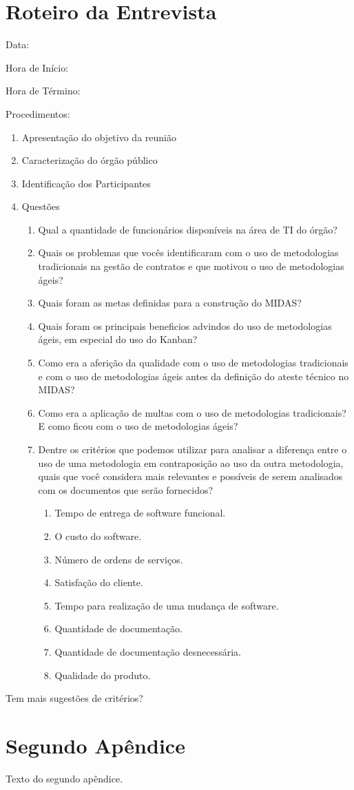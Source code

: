 \begin{apendicesenv}

\partapendices

\chapter{Roteiro da Entrevista}

Data: 

Hora de Início:

Hora de Término:

Procedimentos:

\begin{enumerate}
\item Apresentação do objetivo da reunião
\item Caracterização do órgão público
\item Identificação dos Participantes
\item Questões
\begin{enumerate} 
\item Qual a quantidade de funcionários disponíveis na área de TI do órgão?
\item Quais os problemas que vocês identificaram com o uso de metodologias tradicionais na gestão de contratos e que motivou o uso de metodologias ágeis?
\item Quais foram as metas definidas para a construção do MIDAS?
\item Quais foram os principais beneficios advindos do uso de metodologias ágeis, em especial do uso do Kanban?
\item Como era a aferição da qualidade com o uso de metodologias tradicionais e com o uso de metodologias ágeis antes da definição do ateste técnico no MIDAS?
\item Como era a aplicação de multas com o uso de metodologias tradicionais? E como ficou com o uso de metodologias ágeis?
\item Dentre os critérios que podemos utilizar para analisar a diferença entre o uso de uma metodologia em contraposição ao uso da outra metodologia, quais que você considera mais relevantes e possíveis de serem analisados com os documentos que serão fornecidos?
\begin{enumerate}
\item Tempo de entrega de software funcional.
\item	O custo do software.
\item	Número de ordens de serviços. 
\item	Satisfação do cliente.
\item	Tempo para realização de uma mudança de software.
\item Quantidade de documentação.
\item Quantidade de documentação desnecessária.
\item Qualidade do produto.
\end{enumerate}
\end{enumerate}
\end{enumerate}

Tem mais sugestões de critérios?


\chapter{Segundo Apêndice}

Texto do segundo apêndice.

\end{apendicesenv}
